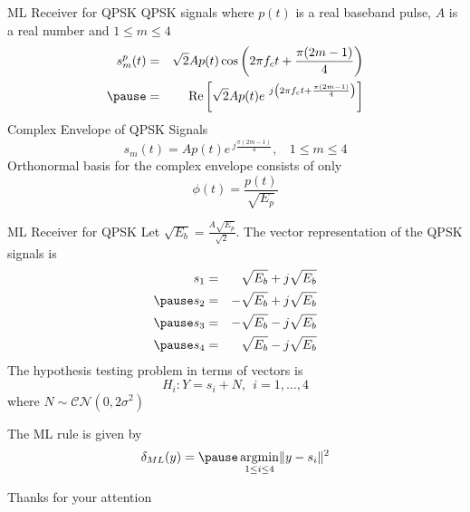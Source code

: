 \documentclass[t]{beamer}
\newcommand{\argmin}{\operatornamewithlimits{argmin}}
\renewcommand\Re{\operatorname{Re}}
\begin{document}
\begin{frame}{ML Receiver for QPSK}
  \footnotesize
  QPSK signals where $p(t)$ is a real baseband pulse, $A$ is a real number and $1 \leq m \leq 4$
    \begin{eqnarray*}
      s_m^p(t) & = & \sqrt{2}Ap(t)\cos \left( 2\pi f_c t + \frac{\pi(2m-1)}{4}\right) \\
               \pause
               & = & \Re\left[\sqrt{2}Ap(t)e^{\ j\left(2\pi f_c t + \frac{\pi(2m-1)}{4}\right)}\right] 
    \end{eqnarray*}
  \pause
  Complex Envelope of QPSK Signals
    \begin{equation*}
      s_m(t) = Ap(t)e^{\ j\frac{\pi(2m-1)}{4}}, \ \ \ \ 1 \leq m \leq 4
    \end{equation*}
  Orthonormal basis for the complex envelope consists of \pause only
    \begin{equation*}
      \phi(t) = \frac{p(t)}{\sqrt{E_p}}
    \end{equation*}
  \normalsize
\end{frame}

\begin{frame}{ML Receiver for QPSK}
  \footnotesize
  Let $\sqrt{E_b} = \frac{A\sqrt{E_p}}{\sqrt{2}}$. The vector representation of the QPSK signals is
    \begin{eqnarray*}
      s_1 & = &  \sqrt{E_b} + j\sqrt{E_b} \\ \pause
      s_2 & = & -\sqrt{E_b} + j\sqrt{E_b} \\ \pause
      s_3 & = & -\sqrt{E_b} - j\sqrt{E_b} \\ \pause
      s_4 & = &  \sqrt{E_b} - j\sqrt{E_b} 
    \end{eqnarray*}
  \pause The hypothesis testing problem in terms of vectors is
    \begin{equation*}
      H_i  :  Y = s_i + N, \ \ i=1,\ldots,4
    \end{equation*}
    \pause where  $N \sim \mathcal{CN}(0, 2\sigma^2)$

  \pause The ML rule is given by
      \begin{equation*}
        \delta_{ML}(y) = \pause \argmin_{1 \leq i \leq 4} \lVert y - s_i \rVert^2
      \end{equation*}
  \normalsize
\end{frame}

\begin{frame}{}
\vfill
\begin{center}
Thanks for your attention
\end{center}
\vfill
\end{frame}
\end{document}
